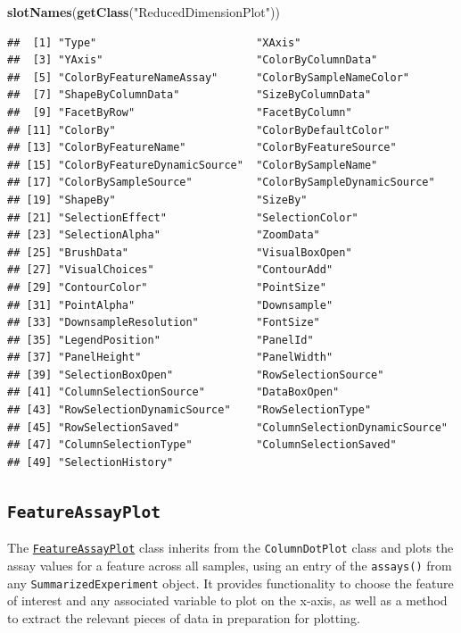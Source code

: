 \documentclass[
]{book}
\newenvironment{Shaded}{\begin{snugshade}}{\end{snugshade}}
\newcommand{\KeywordTok}[1]{\textcolor[rgb]{0.13,0.29,0.53}{\textbf{#1}}}
\newcommand{\NormalTok}[1]{#1}
\newcommand{\StringTok}[1]{\textcolor[rgb]{0.31,0.60,0.02}{#1}}
\begin{document}
\begin{Shaded}
\begin{Highlighting}[]
\KeywordTok{slotNames}\NormalTok{(}\KeywordTok{getClass}\NormalTok{(}\StringTok{"ReducedDimensionPlot"}\NormalTok{))}
\end{Highlighting}
\end{Shaded}

\begin{verbatim}
##  [1] "Type"                         "XAxis"                       
##  [3] "YAxis"                        "ColorByColumnData"           
##  [5] "ColorByFeatureNameAssay"      "ColorBySampleNameColor"      
##  [7] "ShapeByColumnData"            "SizeByColumnData"            
##  [9] "FacetByRow"                   "FacetByColumn"               
## [11] "ColorBy"                      "ColorByDefaultColor"         
## [13] "ColorByFeatureName"           "ColorByFeatureSource"        
## [15] "ColorByFeatureDynamicSource"  "ColorBySampleName"           
## [17] "ColorBySampleSource"          "ColorBySampleDynamicSource"  
## [19] "ShapeBy"                      "SizeBy"                      
## [21] "SelectionEffect"              "SelectionColor"              
## [23] "SelectionAlpha"               "ZoomData"                    
## [25] "BrushData"                    "VisualBoxOpen"               
## [27] "VisualChoices"                "ContourAdd"                  
## [29] "ContourColor"                 "PointSize"                   
## [31] "PointAlpha"                   "Downsample"                  
## [33] "DownsampleResolution"         "FontSize"                    
## [35] "LegendPosition"               "PanelId"                     
## [37] "PanelHeight"                  "PanelWidth"                  
## [39] "SelectionBoxOpen"             "RowSelectionSource"          
## [41] "ColumnSelectionSource"        "DataBoxOpen"                 
## [43] "RowSelectionDynamicSource"    "RowSelectionType"            
## [45] "RowSelectionSaved"            "ColumnSelectionDynamicSource"
## [47] "ColumnSelectionType"          "ColumnSelectionSaved"        
## [49] "SelectionHistory"
\end{verbatim}

\hypertarget{featureassayplot}{%
\subsection{\texorpdfstring{\texttt{FeatureAssayPlot}}{FeatureAssayPlot}}\label{featureassayplot}}

The \href{https://isee.github.io/iSEE/reference/FeatureAssayPlot-class.html}{\texttt{FeatureAssayPlot}} class inherits from the \texttt{ColumnDotPlot} class and plots the assay values for a feature across all samples, using an entry of the \texttt{assays()} from any \texttt{SummarizedExperiment} object.
It provides functionality to choose the feature of interest and any associated variable to plot on the x-axis, as well as a method to extract the relevant pieces of data in preparation for plotting.
\end{document}
